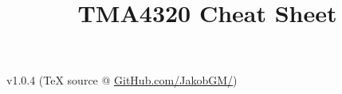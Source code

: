 \documentclass[6pt]{article}
\date{}
\title{TMA4320 Cheat Sheet}
\theoremstyle{definition}
\begin{document}
\begin{multicols*}{3}

\maketitle
v1.0.4 (TeX source @ \href{https://github.com/JakobGM/Numerical-Analysis-Cheat-Sheet}{GitHub.com/JakobGM/})






\end{multicols*}
\end{document}
